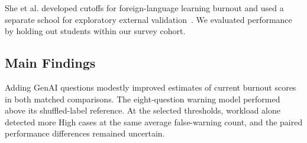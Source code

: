 She et al. developed cutoffs for foreign-language learning burnout and used a separate school for exploratory external validation~\cite{she2026languageburnout}. We evaluated performance by holding out students within our survey cohort.

\subsection{Main Findings}

Adding GenAI questions modestly improved estimates of current burnout scores in both matched comparisons. The eight-question warning model performed above its shuffled-label reference. At the selected thresholds, workload alone detected more High cases at the same average false-warning count, and the paired performance differences remained uncertain.
